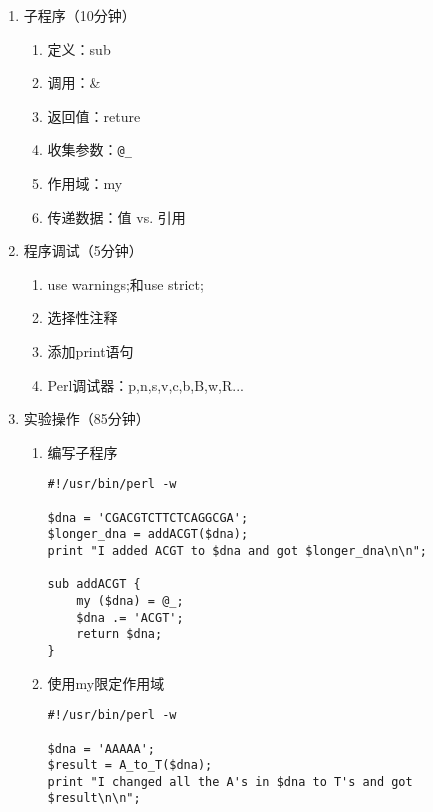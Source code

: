 \documentclass{TIJMUjiaoanSY}
\begin{document}
\firstTail

\newpage
\otherHeader

\begin{enumerate}
  \item 子程序（10分钟）
\vspace*{-1em}
\begin{multicols}{3}
    \begin{enumerate}
      \item 定义：sub
      \item 调用：\&
      \item 返回值：reture
      \item 收集参数：\verb|@_|
      \item 作用域：my
      \item 传递数据：值 vs. 引用
    \end{enumerate}
\end{multicols}
\vspace*{-1em}
  \item 程序调试（5分钟）
\vspace*{-1em}
\begin{multicols}{2}
    \begin{enumerate}
      \item use warnings;和use strict;
      \item 选择性注释
      \item 添加print语句
      \item Perl调试器：p,n,s,v,c,b,B,w,R...
    \end{enumerate}
\end{multicols}
\vspace*{-1em}
  \item 实验操作（85分钟）
    \begin{enumerate}
      \item 编写子程序
\begin{verbatim}
#!/usr/bin/perl -w

$dna = 'CGACGTCTTCTCAGGCGA';
$longer_dna = addACGT($dna);
print "I added ACGT to $dna and got $longer_dna\n\n";

sub addACGT {
    my ($dna) = @_;
    $dna .= 'ACGT';
    return $dna;
}
\end{verbatim}
      \item 使用my限定作用域
\begin{verbatim}
#!/usr/bin/perl -w

$dna = 'AAAAA';
$result = A_to_T($dna);
print "I changed all the A's in $dna to T's and got $result\n\n";


\end{verbatim}
\end{enumerate}
\end{enumerate}
\end{document}
